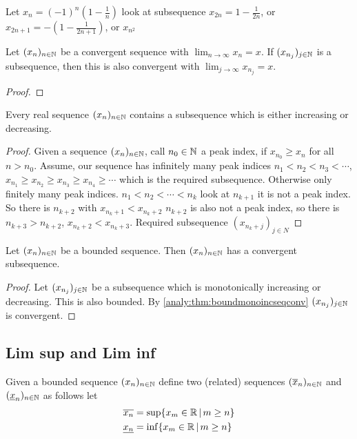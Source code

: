 \documentclass[10pt, a4paper]{article}
\newcommand{\seq}[1][x]{(#1_n)_{n \in \N}}
\begin{document}
\begin{example}
    Let $x_n = (-1) ^ n\left(1 - \frac{1}{n}\right)$
    look at subsequence $x_{2n} = 1 - \frac{1}{2n}$,
    or $x_{2n + 1} = -\left(1 - \frac{1}{2n + 1}\right)$,
    or $x_{n ^ 2}$
\end{example}

\begin{proposition}
    Let $\seq$ be a convergent sequence with $\displaystyle\lim_{n \rightarrow \infty}x_n = x$.
    If $(x_{n_j})_{j \in \mathbb{N}}$ is a subsequence,
    then this is also convergent with $\displaystyle\lim_{j \rightarrow \infty}x_{n_j} = x$.
    \begin{proof}
        
    \end{proof}
\end{proposition}

\begin{lemma}
    Every real sequence $\seq$ contains a subsequence which is either increasing or decreasing.
    \begin{proof}
        Given a sequence $\seq$,
        call $n_0 \in \mathbb{N}$ a peak index,
        if $x_{n_0} \geq x_n$ for all $n > n_0$.
        Assume,
        our sequence has infinitely many peak indices
        $n_1 < n_2 < n_3 < \dotsi$,
        $x_{n_1} \geq x_{n_2} \geq x_{n_3} \geq x_{n_4} \geq \dotsi$ which is the required subsequence.
        Otherwise only finitely many peak indices.
        $n_1 < n_2 < \dotsi < n_k$ look at $n_{k + 1}$ it is not a peak index.
        So there is $n_{k + 2}$ with $x_{n_k + 1} < x_{n_k + 2}$
        $n_{k + 2}$ is also not a peak index,
        so there is $n_{k + 3} > n_{k + 2}$,
        $x_{n_k + 2} < x_{n_k + 3}$.
        Required subsequence $(x_{n_k + j})_{j \in N}$
    \end{proof}
\end{lemma}

\begin{theorem}\label{analy:thm:bolzanoweierstrass}
    Let $\seq$ be a bounded sequence.
    Then $\seq$ has a convergent subsequence.
    \begin{proof}
        Let $(x_{n_j})_{j \in \mathbb{N}}$ be a subsequence which is monotonically increasing or decreasing.
        This is also bounded.
        By \autoref{analy:thm:boundmonoincseqconv} $(x_{n_j})_{j \in \mathbb{N}}$ is convergent.
    \end{proof}
\end{theorem}

\subsection{Lim sup and Lim inf}
Given a bounded sequence $\seq$ define two
(related)
sequences $\seq[\overline{x}]$ and $\seq[\underline{x}]$ as follows let
\begin{align*}
    \overline{x_n} &= \sup\{x_m \in \mathbb{R}\,|\,m \geq n\} \\
    \underline{x_n} &= \inf\{x_m \in \mathbb{R}\,|\,m \geq n\}
\end{align*}
\end{document}
